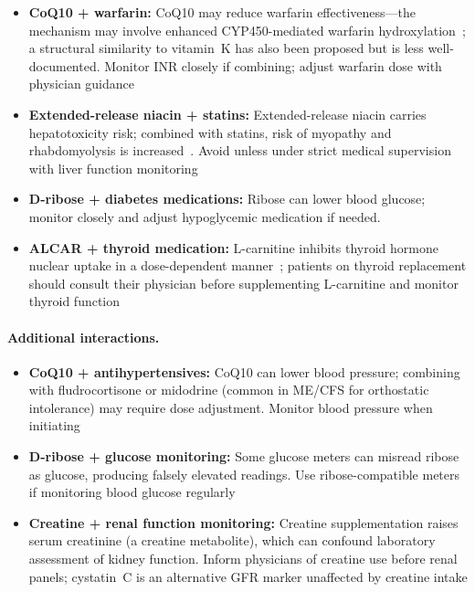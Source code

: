 \begin{warning}
\begin{itemize}
    \item \textbf{CoQ10 + warfarin:} CoQ10 may reduce warfarin effectiveness---the mechanism may involve enhanced CYP450-mediated warfarin hydroxylation~\cite{Zhou2005CoQ10Warfarin}; a structural similarity to vitamin~K has also been proposed but is less well-documented. Monitor INR closely if combining; adjust warfarin dose with physician guidance
    \item \textbf{Extended-release niacin + statins:} Extended-release niacin carries hepatotoxicity risk; combined with statins, risk of myopathy and rhabdomyolysis is increased~\cite{Anderson2014AIMHIGHNiacin}. Avoid unless under strict medical supervision with liver function monitoring
    \item \textbf{D-ribose + diabetes medications:} Ribose can lower blood glucose; monitor closely and adjust hypoglycemic medication if needed.
    \item \textbf{ALCAR + thyroid medication:} L-carnitine inhibits thyroid hormone nuclear uptake in a dose-dependent manner~\cite{Benvenga2001CarnitineHyperthyroidism}; patients on thyroid replacement should consult their physician before supplementing L-carnitine and monitor thyroid function
\end{itemize}
\end{warning}

\paragraph{Additional interactions.}
\begin{itemize}
    \item \textbf{CoQ10 + antihypertensives:} CoQ10 can lower blood pressure; combining with fludrocortisone or midodrine (common in ME/CFS for orthostatic intolerance) may require dose adjustment. Monitor blood pressure when initiating
    \item \textbf{D-ribose + glucose monitoring:} Some glucose meters can misread ribose as glucose, producing falsely elevated readings. Use ribose-compatible meters if monitoring blood glucose regularly
    \item \textbf{Creatine + renal function monitoring:} Creatine supplementation raises serum creatinine (a creatine metabolite), which can confound laboratory assessment of kidney function. Inform physicians of creatine use before renal panels; cystatin~C is an alternative GFR marker unaffected by creatine intake
\end{itemize}

